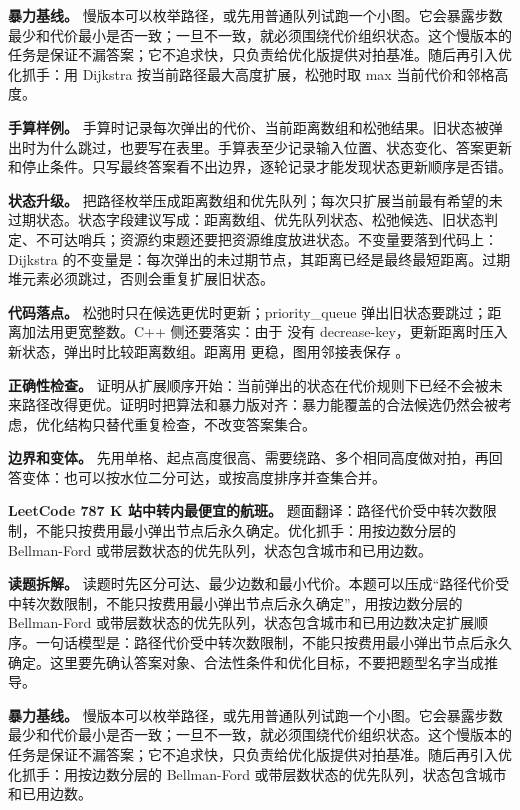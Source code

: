 \textbf{暴力基线。} 慢版本可以枚举路径，或先用普通队列试跑一个小图。它会暴露步数最少和代价最小是否一致；一旦不一致，就必须围绕代价组织状态。这个慢版本的任务是保证不漏答案；它不追求快，只负责给优化版提供对拍基准。随后再引入优化抓手：用 Dijkstra 按当前路径最大高度扩展，松弛时取 max 当前代价和邻格高度。

\textbf{手算样例。} 手算时记录每次弹出的代价、当前距离数组和松弛结果。旧状态被弹出时为什么跳过，也要写在表里。手算表至少记录输入位置、状态变化、答案更新和停止条件。只写最终答案看不出边界，逐轮记录才能发现状态更新顺序是否错。

\textbf{状态升级。} 把路径枚举压成距离数组和优先队列；每次只扩展当前最有希望的未过期状态。状态字段建议写成：距离数组、优先队列状态、松弛候选、旧状态判定、不可达哨兵；资源约束题还要把资源维度放进状态。不变量要落到代码上：Dijkstra 的不变量是：每次弹出的未过期节点，其距离已经是最终最短距离。过期堆元素必须跳过，否则会重复扩展旧状态。

\textbf{代码落点。} 松弛时只在候选更优时更新；priority\_queue 弹出旧状态要跳过；距离加法用更宽整数。C++ 侧还要落实：由于  没有 decrease-key，更新距离时压入新状态，弹出时比较距离数组。距离用  更稳，图用邻接表保存 。

\textbf{正确性检查。} 证明从扩展顺序开始：当前弹出的状态在代价规则下已经不会被未来路径改得更优。证明时把算法和暴力版对齐：暴力能覆盖的合法候选仍然会被考虑，优化结构只替代重复检查，不改变答案集合。

\textbf{边界和变体。} 先用单格、起点高度很高、需要绕路、多个相同高度做对拍，再回答变体：也可以按水位二分可达，或按高度排序并查集合并。

\noindent\textbf{LeetCode 787 K 站中转内最便宜的航班。} 题面翻译：路径代价受中转次数限制，不能只按费用最小弹出节点后永久确定。优化抓手：用按边数分层的 Bellman-Ford 或带层数状态的优先队列，状态包含城市和已用边数。

\textbf{读题拆解。} 读题时先区分可达、最少边数和最小代价。本题可以压成“路径代价受中转次数限制，不能只按费用最小弹出节点后永久确定”，用按边数分层的 Bellman-Ford 或带层数状态的优先队列，状态包含城市和已用边数决定扩展顺序。一句话模型是：路径代价受中转次数限制，不能只按费用最小弹出节点后永久确定。这里要先确认答案对象、合法性条件和优化目标，不要把题型名字当成推导。

\textbf{暴力基线。} 慢版本可以枚举路径，或先用普通队列试跑一个小图。它会暴露步数最少和代价最小是否一致；一旦不一致，就必须围绕代价组织状态。这个慢版本的任务是保证不漏答案；它不追求快，只负责给优化版提供对拍基准。随后再引入优化抓手：用按边数分层的 Bellman-Ford 或带层数状态的优先队列，状态包含城市和已用边数。

